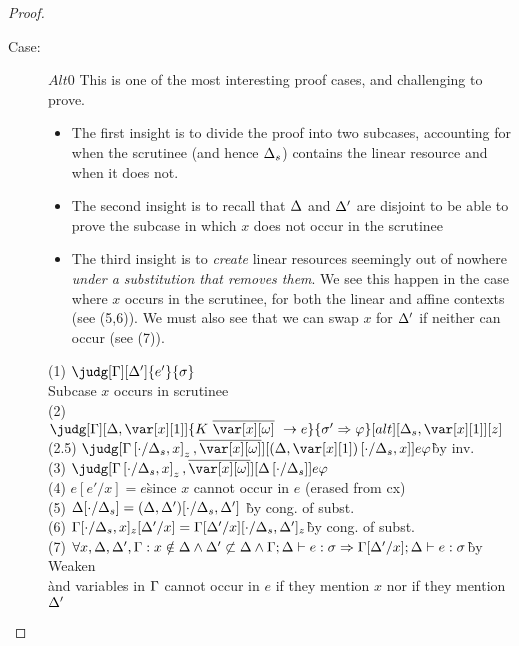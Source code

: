 \begin{proof}
\begin{description}
\item[Case:] $Alt0$
    This is one of the most interesting proof cases, and challenging to prove.
        \begin{itemize}
            \item The first insight is to divide the proof into two subcases, accounting
                for when the scrutinee (and hence $\Delta_s$) contains the linear resource and when it does not.
            \item The second insight is to recall that $\Delta$ and $\Delta'$ are
                disjoint to be able to prove the subcase in which $x$ does not
                occur in the scrutinee
            \item The third insight is to \emph{create} linear resources
                seemingly out of nowhere \emph{under a substitution that
                removes them}. We see this happen in the case where $x$ occurs
                in the scrutinee, for both the linear and affine contexts (see (5,6)).
                We must also see that we can swap $x$ for $\Delta'$ if neither can occur (see (7)).
        \end{itemize}
\begin{tabbing}
  (1) $\judg[\G][\D']{e'}{\s}$\\
  Subcase $x$ occurs in scrutinee\\
    (2) $\judg[\G][\D,\xl]{K~\ov{\xo}~\to e}{\s' \Rightarrow \vp}[alt][\D_s,\xl][z]$\\
    (2.5) $\judg[\subst{\G}{\cdot}{\D_s,x}_z,\ov{\xo}][\subst{(\D,\xl)}{\cdot}{\D_s,x}]{e}{\vp}$\`by inv.\\
    (3) $\judg[\subst{\G}{\cdot}{\D_s,x}_z,\ov{\xo}][\subst{\D}{\cdot}{\D_s}]{e}{\vp}$\\
    (4) $e[e'/x] = e$\` since $x$ cannot occur in $e$ (erased from cx)\\
    (5) $\Delta[\cdot/\Delta_s] = (\Delta,\Delta')[\cdot/\Delta_s,\Delta']$   \` by cong. of subst.\\
    (6) $\Gamma[\cdot/\Delta_s,x]_z[\Delta'/x] = \Gamma[\Delta'/x][\cdot/\Delta_s,\Delta']_z$\` by cong. of subst.\\%
    (7) $\forall x,\Delta,\Delta',\Gamma:x\notin\Delta \land \Delta'\not\subset\Delta \land \Gamma;\Delta \vdash e :\sigma \Rightarrow \Gamma[\Delta'/x];\Delta \vdash e : \sigma$\` by Weaken\\
    \` and variables in $\Gamma$ cannot occur in $e$ if they mention $x$ nor if they mention $\Delta'$ \\

\end{tabbing}
\end{description}
\end{proof}
